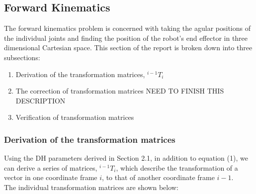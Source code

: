 \documentclass[a4paper]{article}
\begin{document}
\subsection{Forward Kinematics}
The forward kinematics problem is concerned with taking the agular positions of the individual joints and finding the position of the robot's end effector in three dimensional Cartesian space. This section of the report is broken down into three subsections:
\begin{enumerate}
	\item Derivation of the transformation matrices, $^{i-1} T_i$
	\item The correction of transformation matrices NEED TO FINISH THIS DESCRIPTION
	\item Verification of transformation matrices
\end{enumerate}

\subsubsection{Derivation of the transformation matrices}
Using the DH parameters derived in Section 2.1, in addition to equation (1), we can derive a series of matrices, $^{i-1} T_i$, which describe the transformation of a vector in one coordinate frame $i$, to that of another coordinate frame $i-1$.\\

The individual transformation matrices are shown below:\\
\end{document}
